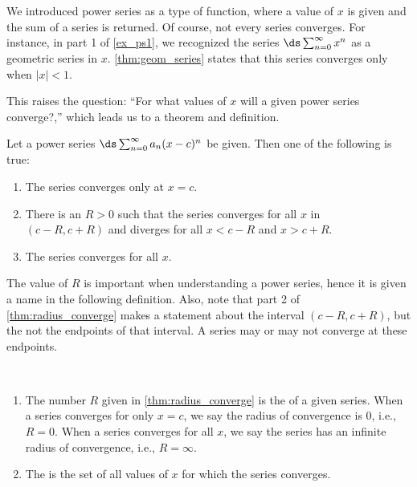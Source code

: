 We introduced power series as a type of function, where a value of $x$ is given and the sum of a series is returned. Of course, not every series converges. For instance, in part 1 of \autoref{ex_ps1}, we recognized the series $\ds \sum_{n=0}^\infty x^n$ as a geometric series in $x$. \autoref{thm:geom_series} states that this series converges only when $|x|<1$. 

This raises the question: ``For what values of $x$ will a given power series converge?,'' which  leads us to a theorem and definition.

{Let a power series $\ds \sum_{n=0}^\infty a_n(x-c)^n$ be given. Then one of the following is true:
\begin{enumerate}
	\item The series converges only at $x=c$.
	\item	There is an $R>0$ such that the series converges for all $x$ in \\	
	$(c-R,c+R)$ and diverges for all $x<c-R$ and $x>c+R$.
	\item	The series converges for all $x$.
\end{enumerate}
}

	
The value of $R$ is important when understanding a power series, hence it is given a name in the following definition. Also, note that part 2 of \autoref{thm:radius_converge} makes a statement about the interval $(c-R,c+R)$, but the not the endpoints of that interval. A series may or may not converge at these endpoints.
	
{\mbox{}\\[-2\baselineskip]
\begin{enumerate}
	\item The number $R$ given in \autoref{thm:radius_converge} is the  of a given series. When a series converges for only $x=c$, we say the radius of convergence is 0, i.e.,  $R=0$. When a series converges for all $x$, we say the series has an infinite radius of convergence, i.e., $R=\infty$.
	\item	The  is the set of all values of $x$ for which the series converges.
\end{enumerate}}

